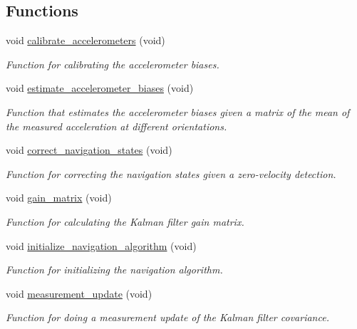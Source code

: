 \subsection*{\-Functions}
\begin{DoxyCompactItemize}
\item 
void \hyperlink{group__nav__eq_gabb3f28a44a35898c77d789734914c4c2}{calibrate\-\_\-accelerometers} (void)
\begin{DoxyCompactList}\small\item\em \-Function for calibrating the accelerometer biases. \end{DoxyCompactList}\item 
void \hyperlink{group__nav__eq_ga272f4012a72ac416888be28bff0236e6}{estimate\-\_\-accelerometer\-\_\-biases} (void)
\begin{DoxyCompactList}\small\item\em \-Function that estimates the accelerometer biases given a matrix of the mean of the measured acceleration at different orientations. \end{DoxyCompactList}\item 
void \hyperlink{group__nav__eq_ga8812381ada5c2786a10e378e4ca34377}{correct\-\_\-navigation\-\_\-states} (void)
\begin{DoxyCompactList}\small\item\em \-Function for correcting the navigation states given a zero-\/velocity detection. \end{DoxyCompactList}\item 
void \hyperlink{group__nav__eq_ga75c4a936b2db01f930ba89babb822f69}{gain\-\_\-matrix} (void)
\begin{DoxyCompactList}\small\item\em \-Function for calculating the \-Kalman filter gain matrix. \end{DoxyCompactList}\item 
void \hyperlink{group__nav__eq_ga8b0f8dc8c2ae1ff3f5e4f27284cf8e77}{initialize\-\_\-navigation\-\_\-algorithm} (void)
\begin{DoxyCompactList}\small\item\em \-Function for initializing the navigation algorithm. \end{DoxyCompactList}\item 
void \hyperlink{group__nav__eq_gaa1673f6cf928e97c6372c56eddb4cc72}{measurement\-\_\-update} (void)
\begin{DoxyCompactList}\small\item\em \-Function for doing a measurement update of the \-Kalman filter covariance. \end{DoxyCompactList}\item 

\end{DoxyCompactItemize}
